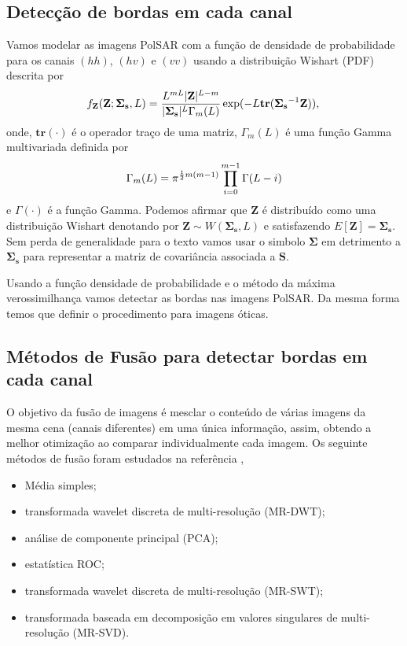 \documentclass[runningheads]{llncs}
\begin{document}
\subsection{Detecção de bordas em cada canal}
 Vamos modelar as imagens PolSAR com a função de densidade de probabilidade para os canais $(hh)$, $(hv)$ e $(vv)$ usando a distribuição Wishart (PDF) descrita por
\begin{equation}
    f_{\mathbf{Z}}(\mathbf{Z};\mathbf{\Sigma_{s}},L)=\frac{L^{mL}|\mathbf{Z}|^{L-m}}{|\mathbf{\Sigma_{s}}|^{L}\Gamma_m(L)} \exp(-L\mathbf{tr}(\mathbf{\Sigma_{s}}^{-1}\mathbf{Z})), \\
\end{equation} 
onde, $\mathbf{tr}(\cdot)$ é o operador traço de uma matriz, $\Gamma_m(L)$ é uma função Gamma multivariada definida por
\begin{equation}\label{cap_acf_10}
	\Gamma_m(L)=\pi^{\frac{1}{2}m(m-1)} \prod_{i=0}^{m-1}\Gamma(L-i) \\
\end{equation}
e $\Gamma(\cdot)$ é a função Gamma. Podemos afirmar que $\mathbf{Z}$ é distribuído como uma distribuição Wishart denotando por $\mathbf{Z}\sim W(\mathbf{\Sigma_{s}}, L)$ e satisfazendo $E[\mathbf{Z}]=\mathbf{\Sigma_{s}}$. Sem perda de generalidade para o texto vamos usar o simbolo $\mathbf{\Sigma}$ em detrimento a $\mathbf{\Sigma_{s}}$ para representar a matriz de covariância associada a $\mathbf{S}$.
 
Usando a função densidade de probabilidade e o método da máxima verossimilhança vamos detectar as bordas nas imagens PolSAR. Da mesma forma temos que definir o procedimento para imagens óticas. 
\subsection{Métodos de Fusão para detectar bordas em cada canal}
 O objetivo da fusão de imagens é mesclar o conteúdo de várias imagens da mesma cena (canais diferentes) em uma única informação, assim, obtendo a melhor otimização ao comparar individualmente cada imagem. Os seguinte métodos de fusão foram estudados na referência \cite{bmf_2020},
\begin{itemize}
  \item Média simples;
  \item transformada wavelet discreta de multi-resolução (MR-DWT);
  \item análise de componente principal (PCA);
  \item estatística ROC;
  \item transformada wavelet discreta de multi-resolução (MR-SWT);
  \item transformada baseada em decomposição em valores singulares de multi-resolução (MR-SVD).
\end{itemize}
\end{document}

